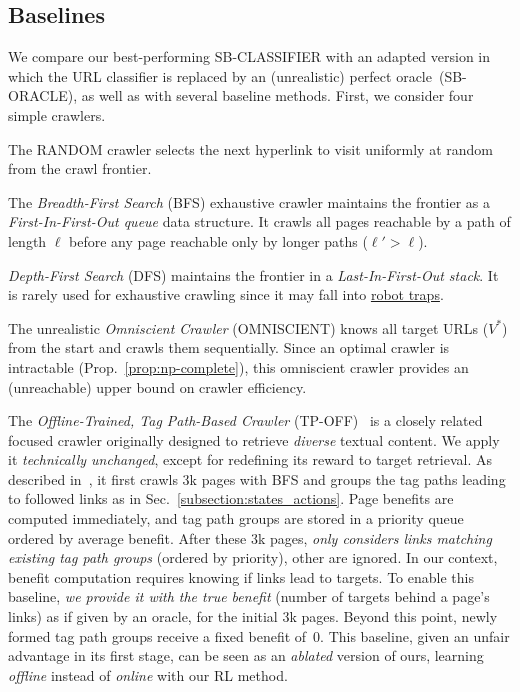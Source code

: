 \subsection{Baselines}
\label{subsection:baselines}

We compare our best-performing \textsf{\small SB-CLASSIFIER} with an adapted version in which the URL classifier is replaced by an (unrealistic) perfect oracle~(\textsf{\small SB-ORACLE}), as well as with several baseline methods. First, we consider four simple crawlers.
\begin{inparaenum}[(i)]
\item The \textsf{\small RANDOM} crawler selects the next hyperlink to visit
	uniformly at random from the crawl frontier.
	\item The
    \emph{Breadth-First Search} (\textsf{\small BFS}) exhaustive crawler maintains the
	frontier as a \emph{First-In-First-Out queue} data structure. It crawls
	all pages reachable by a path of length $\ell$ before any page reachable
	only by longer paths ($\ell' > \ell$).
	\item \emph{Depth-First
    Search} (\textsf{\small{DFS}}) maintains the frontier in a \emph{Last-In-First-Out stack}.
	It is rarely used for exhaustive crawling since it may fall
        into
	\href{https://en.wikipedia.org/wiki/Spider_trap}{robot traps}.
	\item The unrealistic \emph{Omniscient Crawler} (\textsf{\small OMNISCIENT}) knows all target URLs ($V^*$) from the start and crawls them sequentially. Since an optimal crawler is intractable (Prop.~\ref{prop:np-complete}), this omniscient crawler provides an (unreachable) upper bound on crawler efficiency.
\end{inparaenum}


The \emph{Offline-Trained, Tag Path-Based Crawler} (\textsf{\small TP-OFF})~\cite{faheem2015adaptive} is a closely related focused crawler originally designed to retrieve \emph{diverse} textual content. We apply it \emph{technically unchanged}, except for redefining its reward to target retrieval.
As described in~\cite{faheem2015adaptive}, it first crawls 3k pages with BFS and groups the tag paths leading to followed links as in Sec.~\ref{subsection:states_actions}. Page benefits are computed immediately, and tag path groups are stored in a priority queue ordered by average benefit. After these 3k pages, \cite{faheem2015adaptive} \emph{only considers links matching existing tag path groups} (ordered by priority), other are ignored. 
In our context, benefit computation requires knowing if links lead to targets. To enable this baseline, \emph{we provide it with the true benefit} (number of targets behind a page's links) as if given by an oracle, for the initial 3k pages. Beyond this point, newly formed tag path groups receive a fixed benefit of~0. This baseline, given an unfair advantage in its first stage, can be seen as an \emph{ablated} version of ours, learning \emph{offline} instead of \emph{online} with our RL method.

